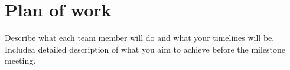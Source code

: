 \section{Plan of work}
\label{sec:plan}
Describe what each team member will do and what your timelines will 
be.  Includea detailed description of what you aim to achieve before 
the milestone meeting.